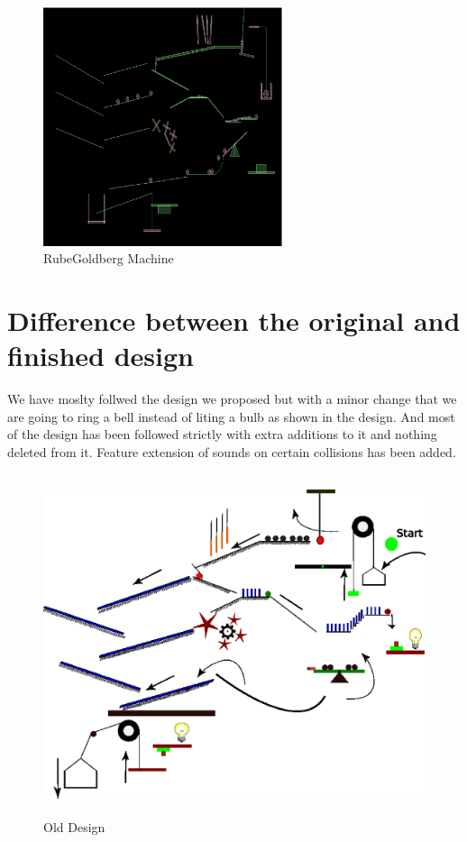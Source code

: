 \documentclass[a4paper,11pt]{article}
\begin{document}
	\begin{figure}[ht]
			\begin{center}
			\includegraphics[height=70mm]{images/machine.eps}
	\caption{RubeGoldberg Machine }	
	\label{fig:machine}
	\end{center}
	\end{figure}

\pagebreak

\section{Difference between the original and finished design}
We have moslty follwed the design we proposed but with a minor change that we are going to ring a bell instead of liting a bulb as shown in the design. And most of the design has been followed strictly with extra additions to it and nothing deleted from it. Feature extension of sounds on certain collisions has been added.
\pagebreak
	\begin{figure}[ht]
	\begin{center}
	\includegraphics[height=100mm]{images/RBM.eps}
	\caption{Old Design }	
	\end{center}
	\end{figure}
\end{document}
